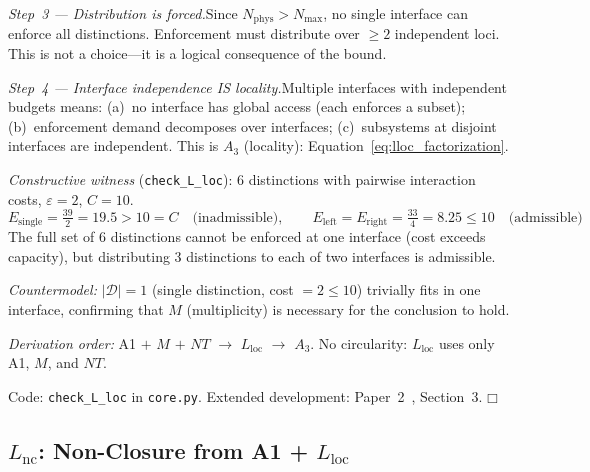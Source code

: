 \documentclass[11pt]{article}
\providecommand{\square}{\ensuremath{\mdlgwhtsquare}}
\newcommand{\eps}{\varepsilon}
\newcommand{\Lloc}{L_{\mathrm{loc}}}
\begin{document}
\textit{Step~3 --- Distribution is forced.}\quad Since $N_{\mathrm{phys}} > N_{\max}$, no single interface can enforce all distinctions.  Enforcement must distribute over $\ge 2$ independent loci.  This is not a choice---it is a logical consequence of the bound.

\textit{Step~4 --- Interface independence IS locality.}\quad Multiple interfaces with independent budgets means: (a)~no interface has global access (each enforces a subset); (b)~enforcement demand decomposes over interfaces; (c)~subsystems at disjoint interfaces are independent.  This is $A_3$ (locality): Equation~\eqref{eq:lloc_factorization}.

\textit{Constructive witness} (\texttt{check\_L\_loc}): 6 distinctions with pairwise interaction costs, $\eps = 2$, $C = 10$.
\begin{equation}
E_{\mathrm{single}} = \tfrac{39}{2} = 19.5 > 10 = C \quad\text{(inadmissible)}, \qquad E_{\mathrm{left}} = E_{\mathrm{right}} = \tfrac{33}{4} = 8.25 \le 10 \quad\text{(admissible)}
\end{equation}
The full set of 6 distinctions cannot be enforced at one interface (cost exceeds capacity), but distributing 3 distinctions to each of two interfaces is admissible.

\textit{Countermodel:} $|\mathcal{D}| = 1$ (single distinction, cost $= 2 \le 10$) trivially fits in one interface, confirming that $M$ (multiplicity) is necessary for the conclusion to hold.

\textit{Derivation order:} A1 $+$ $M$ $+$ $NT$ $\to$ $\Lloc$ $\to$ $A_3$.  No circularity: $\Lloc$ uses only A1, $M$, and $NT$.

Code: \texttt{check\_L\_loc} in \texttt{core.py}.  Extended development: Paper~2~\cite{P2}, Section~3.  \hfill$\square$


\subsection{\texorpdfstring{$L_{\mathrm{nc}}$}{Lnc}: Non-Closure from A1 + \texorpdfstring{$L_{\mathrm{loc}}$}{Lloc}}
\end{document}
